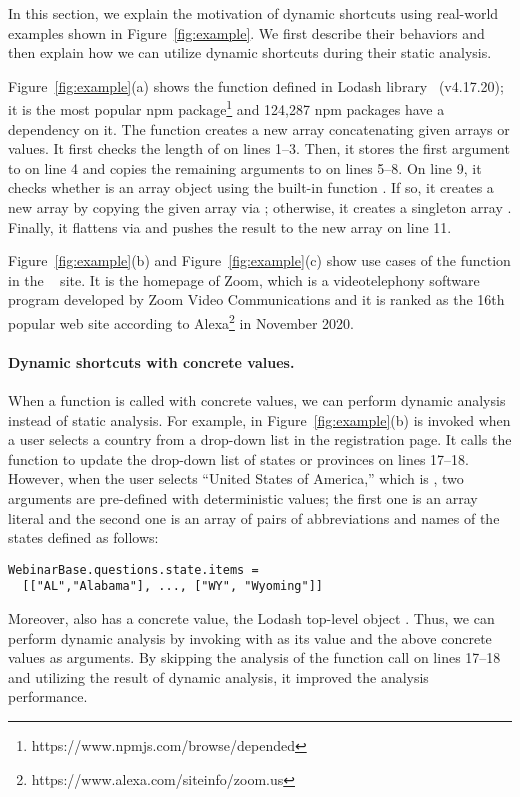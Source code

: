 In this section, we explain the motivation of dynamic shortcuts
using real-world examples shown in Figure~\ref{fig:example}.
We first describe their behaviors and then explain how we can utilize
dynamic shortcuts during their static analysis.

Figure~\ref{fig:example}(a) shows the  function defined
in Lodash library~\cite{lodash} (v4.17.20); it is
the most popular npm package\footnote{https://www.npmjs.com/browse/depended}
and 124,287 npm packages have a dependency on it.
The  function creates a new array concatenating given arrays or values.
It first checks the length of  on lines 1--3.
Then, it stores the first argument to  on line 4 and
copies the remaining arguments to  on lines 5--8.
On line 9, it checks whether  is an array object using
the built-in function .  If so, it creates a new array
by copying the given array via ; otherwise,
it creates a singleton array \jscode{[array]}.  Finally, it flattens
 via  and pushes the result to the
new array on line 11.

Figure~\ref{fig:example}(b) and Figure~\ref{fig:example}(c) show use
cases of the  function in the ~\cite{zoom} site.
It is the homepage of Zoom, which is a videotelephony software program developed by Zoom
Video Communications and it is ranked as the 16th popular web site according
to Alexa\footnote{https://www.alexa.com/siteinfo/zoom.us} in November 2020.

\paragraph{Dynamic shortcuts with concrete values.}
When a function is called with concrete values, we can perform
dynamic analysis instead of static analysis.
For example,  in Figure~\ref{fig:example}(b)
is invoked when a user selects a country from a drop-down list in the registration page.
It calls the  function to update the drop-down list of
states or provinces on lines 17--18.  However, when the user selects ``United States of America,''
which is , two arguments are pre-defined with
deterministic values; the first one is an array literal
 and the second one is an array of pairs
of abbreviations and names of the states defined as follows:
\begin{lstlisting}[style=myJSstyle,numbers=none]
WebinarBase.questions.state.items =
  [["AL","Alabama"], ..., ["WY", "Wyoming"]]
\end{lstlisting}
Moreover,  also has a concrete value, the Lodash top-level object \jscode{\_}.
Thus, we can perform dynamic analysis by invoking  with
\jscode{\_} as its  value and the above concrete values as arguments. 
By skipping the analysis of the function call on lines 17--18 and
utilizing the result of dynamic analysis, it improved the analysis performance.

